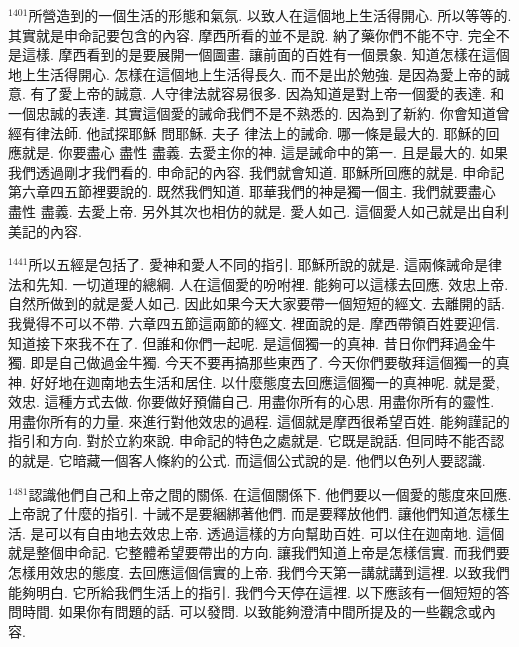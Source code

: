 \documentclass{book}
\begin{document}
$^{1401}$所營造到的一個生活的形態和氣氛.
以致人在這個地上生活得開心.
所以等等的.
其實就是申命記要包含的內容.
摩西所看的並不是說.
納了藥你們不能不守.
完全不是這樣.
摩西看到的是要展開一個圖畫.
讓前面的百姓有一個景象.
知道怎樣在這個地上生活得開心.
怎樣在這個地上生活得長久.
而不是出於勉強.
是因為愛上帝的誠意.
有了愛上帝的誠意.
人守律法就容易很多.
因為知道是對上帝一個愛的表達.
和一個忠誠的表達.
其實這個愛的誡命我們不是不熟悉的.
因為到了新約.
你會知道曾經有律法師.
他試探耶穌 問耶穌.
夫子 律法上的誡命.
哪一條是最大的.
耶穌的回應就是.
你要盡心 盡性 盡義.
去愛主你的神.
這是誡命中的第一.
且是最大的.
如果我們透過剛才我們看的.
申命記的內容.
我們就會知道.
耶穌所回應的就是.
申命記第六章四五節裡要說的.
既然我們知道.
耶華我們的神是獨一個主.
我們就要盡心 盡性 盡義.
去愛上帝.
另外其次也相仿的就是.
愛人如己.
這個愛人如己就是出自利美記的內容.

$^{1441}$所以五經是包括了.
愛神和愛人不同的指引.
耶穌所說的就是.
這兩條誡命是律法和先知.
一切道理的總綱.
人在這個愛的吩咐裡.
能夠可以這樣去回應.
效忠上帝.
自然所做到的就是愛人如己.
因此如果今天大家要帶一個短短的經文.
去離開的話.
我覺得不可以不帶.
六章四五節這兩節的經文.
裡面說的是.
摩西帶領百姓要迎信.
知道接下來我不在了.
但誰和你們一起呢.
是這個獨一的真神.
昔日你們拜過金牛獨.
即是自己做過金牛獨.
今天不要再搞那些東西了.
今天你們要敬拜這個獨一的真神.
好好地在迦南地去生活和居住.
以什麼態度去回應這個獨一的真神呢.
就是愛,效忠.
這種方式去做.
你要做好預備自己.
用盡你所有的心思.
用盡你所有的靈性.
用盡你所有的力量.
來進行對他效忠的過程.
這個就是摩西很希望百姓.
能夠謹記的指引和方向.
對於立約來說.
申命記的特色之處就是.
它既是說話.
但同時不能否認的就是.
它暗藏一個客人條約的公式.
而這個公式說的是.
他們以色列人要認識.

$^{1481}$認識他們自己和上帝之間的關係.
在這個關係下.
他們要以一個愛的態度來回應.
上帝說了什麼的指引.
十誡不是要綑綁著他們.
而是要釋放他們.
讓他們知道怎樣生活.
是可以有自由地去效忠上帝.
透過這樣的方向幫助百姓.
可以住在迦南地.
這個就是整個申命記.
它整體希望要帶出的方向.
讓我們知道上帝是怎樣信實.
而我們要怎樣用效忠的態度.
去回應這個信實的上帝.
我們今天第一講就講到這裡.
以致我們能夠明白.
它所給我們生活上的指引.
我們今天停在這裡.
以下應該有一個短短的答問時間.
如果你有問題的話.
可以發問.
以致能夠澄清中間所提及的一些觀念或內容.
\newpage
\end{document}
